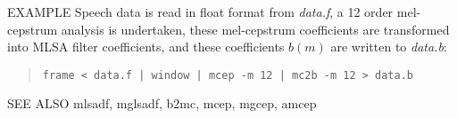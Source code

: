 \begin{options}
\end{options}

\begin{qsection}{EXAMPLE}
Speech data is read in float format from {\em data.f},
a 12 order mel-cepstrum analysis is undertaken,
these mel-cepstrum coefficients are transformed into
MLSA filter coefficients, and these coefficients $b(m)$
are written to {\em data.b}:
\begin{quote}
 \verb!frame < data.f | window | mcep -m 12 | mc2b -m 12 > data.b!
\end{quote} 
\end{qsection}

\begin{qsection}{SEE ALSO}
 mlsadf, mglsadf, b2mc, mcep, mgcep, amcep
\end{qsection}
